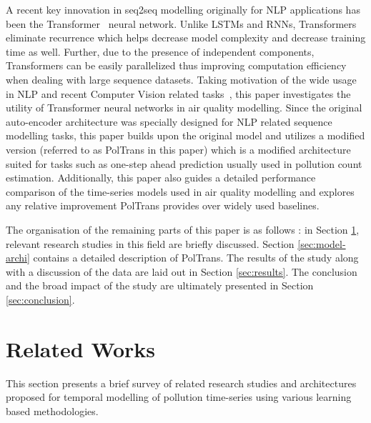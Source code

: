 \documentclass[10pt,journal]{IEEEtran}
\begin{document}
A recent key innovation in seq2seq modelling originally for NLP applications has been the Transformer~\cite{Vaswani.2017} neural network. Unlike LSTMs and RNNs, Transformers eliminate recurrence which helps decrease model complexity and decrease training time as well. Further, due to the presence of independent components, Transformers can be easily parallelized thus improving computation efficiency when dealing with large sequence datasets. Taking motivation of the wide usage in NLP and recent Computer Vision related tasks~\cite{Parmer.2018}, this paper investigates the utility of Transformer neural networks in air quality modelling. Since the original auto-encoder architecture was specially designed for NLP related sequence modelling tasks, this paper builds upon the original model and utilizes a modified version (referred to as {PolTrans} in this paper) which is a modified architecture suited for tasks such as one-step ahead prediction usually used in pollution count estimation. Additionally, this paper also guides a detailed performance comparison of the time-series models used in air quality modelling and explores any relative improvement {PolTrans} provides over widely used baselines.

The organisation of the remaining parts of this paper is as follows : in Section \ref{sec:related-works}, relevant research studies in this field are briefly discussed. Section \ref{sec:model-archi} contains a detailed description of {PolTrans}. The results of the study along with a discussion of the data are laid out in Section \ref{sec:results}. The conclusion and the broad impact of the study are ultimately presented in Section \ref{sec:conclusion}.

\section{Related Works}
\label{sec:related-works}

This section presents a brief survey of related research studies and architectures proposed for temporal modelling of pollution time-series using various learning based methodologies.
\end{document}
